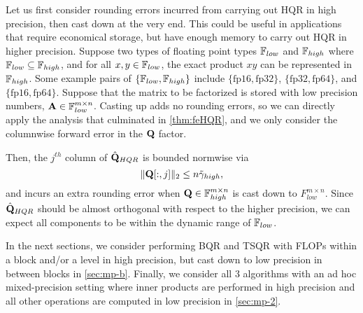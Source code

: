 Let us first consider rounding errors incurred from carrying out HQR in high precision, then cast down at the very end.
This could be useful in applications that require economical storage, but have enough memory to carry out HQR in higher precision. 
Suppose two types of floating point types $\mathbb{F}_{low}$ and $\mathbb{F}_{high}$ where $\mathbb{F}_{low}\subseteq \mathbb{F}_{high}$, and for all $x,y\in\mathbb{F}_{low}$, the exact product $xy$ can be represented in $\mathbb{F}_{high}$.
Some example pairs of $\{\mathbb{F}_{low}, \mathbb{F}_{high}\}$ include $\{\text{fp16}, \text{fp32}\}$, $\{\text{fp32}, \text{fp64}\}$, and $\{\text{fp16}, \text{fp64}\}$.
Suppose that the matrix to be factorized is stored with low precision numbers, $\mathbf{A}\in\mathbb{F}_{low}^{m\times n}$.
Casting up adds no rounding errors, so we can directly apply the analysis that culminated in \cref{thm:feHQR}, and we only consider the columnwise forward error in the $\mathbf{Q}$ factor.

Then, the $j^{th}$ column of $\hat{\mathbf{Q}}_{HQR}$ is bounded normwise via $$ \|\mathbf{Q}[:,j]\|_2 \leq n\tilde{\gamma}_{high},$$ and incurs an extra rounding error when $\mathbf{Q}\in\mathbb{F}_{high}^{m\times n}$ is cast down to $F_{low}^{m\times n}$.
Since $\hat{\mathbf{Q}}_{HQR}$ should be almost orthogonal with respect to the higher precision, we can expect all components to be within the dynamic range of $\mathbb{F}_{low}$.


In the next sections, we consider performing BQR and TSQR with FLOPs within a block and/or a level in high precision, but cast down to low precision in between blocks in \ref{sec:mp-b}.
Finally, we consider all 3 algorithms with an ad hoc mixed-precision setting where inner products are performed in high precision and all other operations are computed in low precision in \ref{sec:mp-2}.


